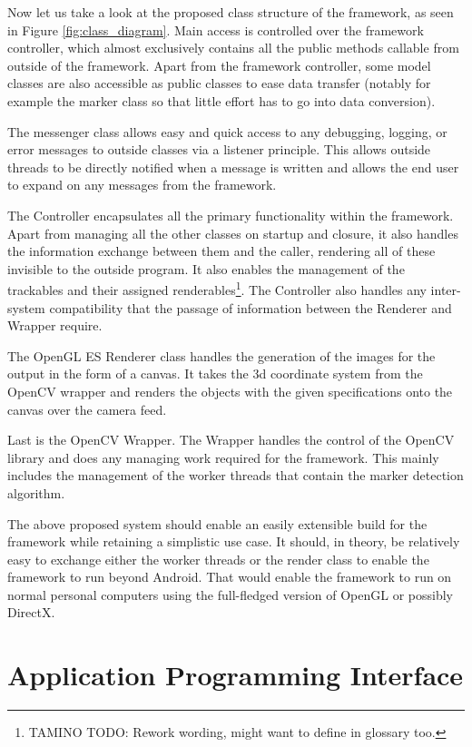 Now let us take a look at the proposed class structure of the framework, as seen in Figure \ref{fig:class_diagram}.
Main access is controlled over the framework controller, which almost exclusively contains all the public methods callable from outside of the framework.
Apart from the framework controller, some model classes are also accessible as public classes to ease data transfer (notably for example the marker class so that little effort has to go into data conversion).

The messenger class allows easy and quick access to any debugging, logging, or error messages to outside classes via a listener principle.
This allows outside threads to be directly notified when a message is written and allows the end user to expand on any messages from the framework.

The Controller encapsulates all the primary functionality within the framework.
Apart from managing all the other classes on startup and closure, it also handles the information exchange between them and the caller, rendering all of these invisible to the outside program.
It also enables the management of the trackables and their assigned renderables\footnote{TAMINO TODO: Rework wording, might want to define in glossary too.}.
The Controller also handles any inter-system compatibility that the passage of information between the Renderer and Wrapper require.

The OpenGL ES Renderer class handles the generation of the images for the output in the form of a canvas.
It takes the 3d coordinate system from the OpenCV wrapper and renders the objects with the given specifications onto the  canvas over the camera feed.

Last is the OpenCV Wrapper. The Wrapper handles the control of the OpenCV library and does any managing work required for the framework.
This mainly includes the management of the worker threads that contain the marker detection algorithm.

The above proposed system should enable an easily extensible build for the framework while retaining a simplistic use case.
It should, in theory, be relatively easy to exchange either the worker threads or the render class to enable the framework to run beyond Android.
That would enable the framework to run on normal personal computers using the full-fledged version of OpenGL or possibly DirectX.

\section{Application Programming Interface}

